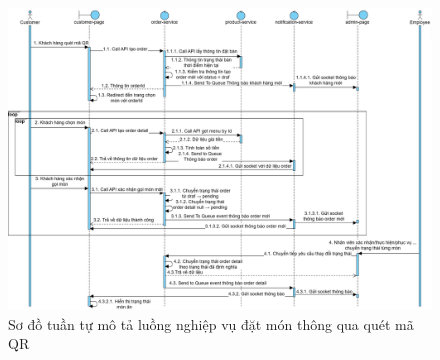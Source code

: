 \begin{figure}[h]
	\centering
	\includegraphics[width=\textwidth]{images/hChip/main-flow/order.png}
	\caption{Sơ đồ tuần tự mô tả luồng nghiệp vụ đặt món thông qua quét mã QR}
	\label{fig:order-sequence-flow}
\end{figure}

